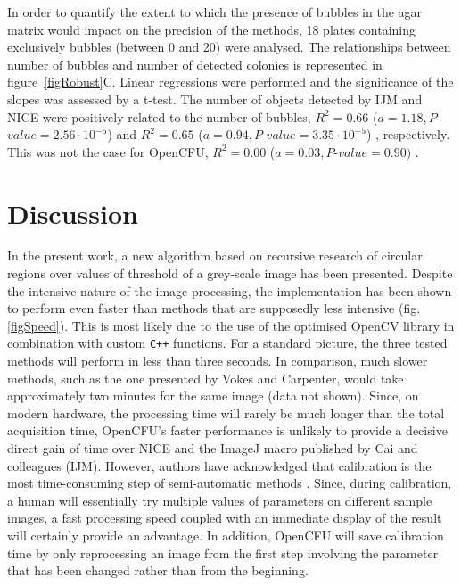 \documentclass[10pt]{article}
\newcommand{\IJM}{IJM}
\newcommand{\BubbleNoiseOCFU}{$R^2 = 0.00$ ($a=0.03, P$-$value=0.90)$ }
\newcommand{\BubbleNoiseNICE}{$R^2 = 0.65$ ($a=0.94, P$-$value=3.35\cdot 10^{-5}$) }
\newcommand{\BubbleNoiseIJM}{$R^2 = 0.66$ ($a=1.18, P$-$value=2.56\cdot 10^{-5}$) }
\begin{document}
In order to quantify the extent to which the presence of bubbles in the agar matrix would impact on
the precision of the methods, 18 plates containing exclusively bubbles (between
0 and 20) were analysed. The relationships between number of bubbles and number
of detected colonies is represented in figure~\ref{figRobust}C. Linear
regressions were performed and the significance of the slopes was assessed by a
t-test. The number of objects detected by \IJM{} and NICE were positively
related to the number of bubbles, \BubbleNoiseIJM and \BubbleNoiseNICE,
respectively. This was not the case for OpenCFU, \BubbleNoiseOCFU.



\section*{Discussion}
In the present work, a new algorithm based on recursive research of circular
regions over values of threshold of a grey-scale image has been presented.
Despite the intensive nature of the image processing, the implementation has
been shown to perform even faster than methods that are supposedly less intensive
\cite{clarke_lowcost_2010,cai_optimized_2011} (fig.\ref{figSpeed}). This is most
likely due to the use of the optimised OpenCV library\cite{opencv_library} in
combination with custom \texttt{C++} functions.
For a standard picture, the three tested methods will perform in less than three
seconds. In comparison, much slower methods, such as the one presented by Vokes
and Carpenter\cite{vokes_using_2008}, would take approximately two minutes for
the same image (data not shown).
Since, on modern hardware, the processing time will rarely be much longer than
the total acquisition time, OpenCFU's faster performance is unlikely to provide
a decisive direct gain of time over NICE\cite{clarke_lowcost_2010} and
the ImageJ macro published by Cai
and colleagues (\IJM{})\cite{cai_optimized_2011}.
However, authors have acknowledged that calibration is the most time-consuming
step of semi-automatic methods \cite{vokes_using_2008,cai_optimized_2011}.
Since, during calibration, a human will essentially try multiple values of
parameters on different sample images, a fast processing speed coupled with an
immediate display of the result will certainly provide an advantage. In
addition, OpenCFU will save calibration time by only reprocessing an image from
the first step involving the parameter that has been changed rather than from
the beginning.
\end{document}
